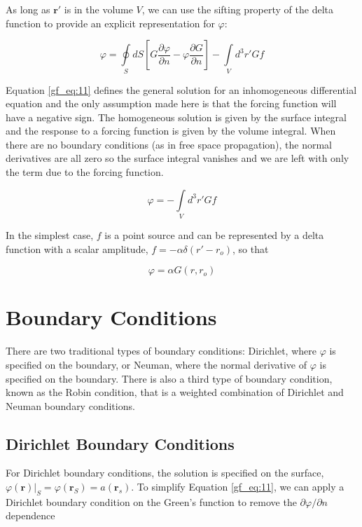 As long as $\mathbf{r}'$ is in the volume $V$, we can use the sifting property of the delta function to provide an explicit representation for $\varphi$:

\begin{equation}
\boxed{\varphi = \oint\limits_{S}dS\left[G\frac{\partial \varphi}{\partial n} - \varphi\frac{\partial G}{\partial n} \right] -\int\limits_{V}d^3r' Gf}
\label{gf_eq:11}
\end{equation}
\renewcommand{\baselinestretch}{2} \small\normalsize

Equation \ref{gf_eq:11} defines the general solution for an inhomogeneous differential equation and the only assumption made here is that the forcing function will have a negative sign. The homogeneous solution is given by the surface integral and the response to a forcing function is given by the volume integral. When there are no boundary conditions (as in free space propagation), the normal derivatives are all zero so the surface integral vanishes and we are left with only the term due to the forcing function.

\begin{equation}
\varphi = -\int\limits_{V}d^3r' Gf
\label{gf_eq:11aa}
\end{equation}
\renewcommand{\baselinestretch}{2} \small\normalsize

In the simplest case, $f$ is a point source and can be represented by a delta function with a scalar amplitude, $ f = -\alpha\delta(r'-r_o)$, so that

\begin{equation}
\varphi = \alpha G(r,r_o)
\label{gf_eq:11ab}
\end{equation}
\renewcommand{\baselinestretch}{2} \small\normalsize

\section {Boundary Conditions}
There are two traditional types of boundary conditions: Dirichlet, where $\varphi$ is specified on the boundary, or Neuman, where the normal derivative of $\varphi$ is specified on the boundary. There is also a third type of boundary condition, known as the Robin condition, that is a weighted combination of Dirichlet and Neuman boundary conditions.

\subsection {Dirichlet Boundary Conditions}
For Dirichlet boundary conditions, the solution is specified on the surface, $\varphi\left(\mathbf{r}\right) |_{S} = \varphi\left(\mathbf{r}_S \right) = a\left(\mathbf{r}_s\right)$. To simplify Equation \ref{gf_eq:11}, we can apply a Dirichlet boundary condition on the Green’s function to remove the $\partial \varphi /\partial n$ dependence

